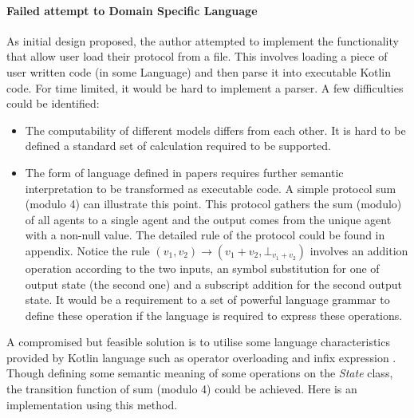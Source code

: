 \paragraph{Failed attempt to Domain Specific Language}
As initial design proposed, the author attempted to implement the functionality that allow user load their protocol from a file.
This involves loading a piece of user written code (in some Language) and then parse it into executable Kotlin code.
For time limited, it would be hard to implement a parser.
A few difficulties could be identified:
\begin{itemize}
  \item The computability of different models differs from each other. It is hard to be defined a standard set of calculation required to be supported.
  \item The form of language defined in papers requires further semantic interpretation to be transformed as executable code. A simple protocol
  sum (modulo 4) \cite{AspnesR2007} can illustrate this point. This protocol gathers the sum (modulo) of all agents to a single agent and the output
comes from the unique agent with a non-null value. The detailed rule of the protocol could be found in appendix.
Notice the rule $(v_{1}, v_{2}) \to (v_{1} + v_{2}, \bot_{v_{1} + v_{2}})$ involves an addition operation according to
the two inputs, an symbol substitution for one of output state (the second one) and a subscript addition for the second
output state. It would be a requirement to a set of powerful language grammar to define these operation if the language is required to express these operations.
\end{itemize}
A compromised but feasible solution is to utilise some language characteristics provided by Kotlin language such as operator overloading and infix expression \cite{Kotlin}.
Though defining some semantic meaning of some operations on the \textit{State} class, the transition function of sum (modulo 4) could be achieved.
Here is an implementation using this method.


